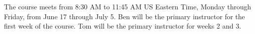 The course meets from 8:30 AM to 11:45 AM US Eastern Time, Monday through Friday, from June 17
through July 5. Ben will be the primary instructor for the first week of the
course. Tom will be the primary instructor for weeks 2 and 3. 


